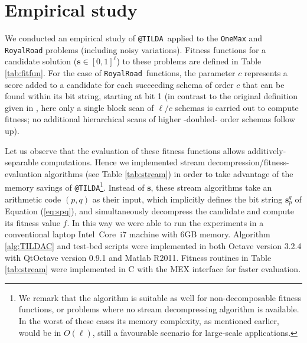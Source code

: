 \documentclass{sig-alternate}
\makeatletter
\newcommand{\bs}{{\mathbf s}}
\newcommand{\TILDAC}{\texttt{@TILDA}}
\newcommand{\onemax}{\texttt{OneMax}}
\newcommand{\rroad}{\texttt{RoyalRoad}}
\makeatother
\begin{document}
\section{Empirical study}
\label{sec:experiments}

We conducted an empirical study of \TILDAC~applied to the \onemax\cite{Pelikan09} and \rroad\cite{Mitchell91} problems (including noisy variations). Fitness functions for a candidate solution ($\bs \in [0,1]^\ell$) to these problems are defined in Table \ref{tab:fitfun}. For the case of \rroad~functions, the parameter $c$ represents a score added to a candidate for each succeeding schema of order $c$ that can be found within its bit string, starting at bit 1 (in contrast to the original definition given in \cite{Mitchell91}, here only a single block scan of $\ell/c$ schemas is carried out to compute fitness; no additional hierarchical scans of higher -doubled- order schemas follow up).

Let us observe that the evaluation of these fitness functions allows additively-separable computations. Hence we implemented stream decompression/fitness-evaluation algorithms (see Table \ref{tab:stream}) in order to take advantage of the memory savings of \TILDAC\footnote{We remark that the algorithm is suitable as well for non-decomposable fitness functions, or problems where no stream decompressing algorithm is available. In the worst of these cases its memory complexity, as mentioned earlier, would be in $O(\ell)$, still a favourable scenario for large-scale applications.}. Instead of $\bs$, these stream algorithms take an arithmetic code $(p,q)$ as their input, which implicitly defines the bit string $\bs_p^q$ of Equation (\ref{eq:spq}), and simultaneously decompress the candidate and compute its fitness value $f$. In this way we were able to run the experiments in a conventional laptop Intel\textregistered~Core\texttrademark~i7 machine with 6GB memory. Algorithm \ref{alg:TILDAC} and test-bed scripts were implemented in both Octave version 3.2.4 with QtOctave version 0.9.1 and Matlab R2011. Fitness routines in Table \ref{tab:stream} were implemented in C with the MEX interface for faster evaluation.
\end{document}
